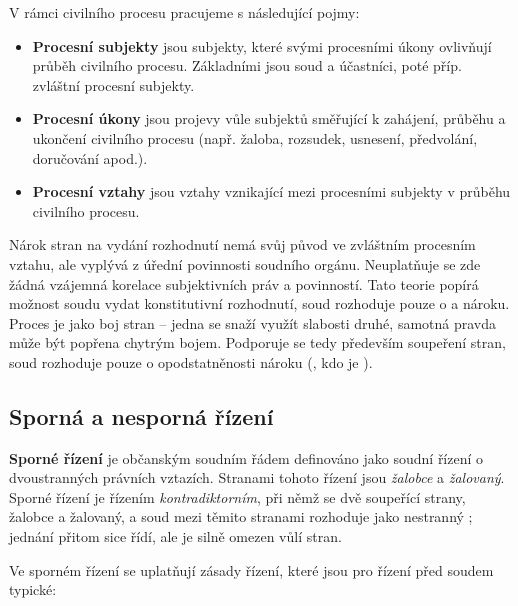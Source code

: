V rámci civilního procesu pracujeme s následující pojmy:

\begin{itemize}
    \item \textbf{Procesní subjekty} jsou subjekty, které svými procesními úkony ovlivňují průběh civilního procesu. Základními jsou soud a účastníci, poté příp. zvláštní procesní subjekty.
    \item \textbf{Procesní úkony} jsou projevy vůle subjektů směřující k zahájení, průběhu a ukončení civilního procesu (např. žaloba, rozsudek, usnesení, předvolání, doručování apod.).
    \item \textbf{Procesní vztahy} jsou vztahy vznikající mezi procesními subjekty v průběhu civilního procesu.
\end{itemize}

Nárok stran na vydání rozhodnutí nemá svůj původ ve zvláštním procesním vztahu, ale vyplývá z úřední povinnosti soudního orgánu. Neuplatňuje se zde žádná vzájemná korelace subjektivních práv a povinností. Tato teorie popírá možnost soudu vydat konstitutivní rozhodnutí, soud rozhoduje pouze o  a  nároku. Proces je jako boj stran – jedna se snaží využít slabosti druhé, samotná pravda může být popřena chytrým bojem. Podporuje se tedy především soupeření stran, soud rozhoduje pouze o opodstatněnosti nároku (, kdo je ).

\subsection{Sporná a nesporná řízení}

\textbf{Sporné řízení}  je občanským soudním řádem definováno jako soudní řízení o dvoustranných právních vztazích. Stranami tohoto řízení jsou \textit{žalobce} a \textit{žalovaný}. Sporné řízení je řízením \textit{kontradiktorním}, při němž se  dvě soupeřící strany, žalobce a žalovaný, a soud mezi těmito stranami rozhoduje jako nestranný ; jednání přitom sice řídí, ale je silně omezen vůlí stran.

Ve sporném řízení se uplatňují zásady řízení, které jsou pro řízení před soudem typické:

